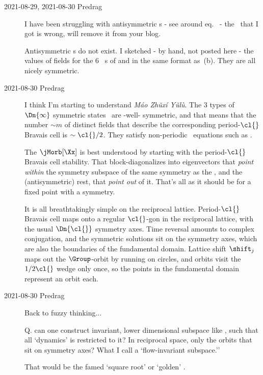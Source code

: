 \begin{description}
\item[2021-08-29, 2021-08-30 Predrag]
I have been struggling with antisymmetric {\lattstate}s - see around
eq.~ -  the \HillDet\ that I got is wrong, will
remove it from your blog.

Antisymmetric {\lattstate}s do not exist. I sketched - by hand,
not posted here -  the values of
{\lattstate} fields for the 6 \henlatt\  {\lattstate}s of
 and  in the same format as
\,(b). They are all nicely symmetric.

\item[2021-08-30 Predrag]
I think I'm starting to understand \emph{Máo Zhǔxí Yǔlù}. The 3 types of
$\Dn{\infty}$ symmetric states \Xx\ are -well- symmetric, and that means
that the number $\sim m$ of distinct fields that describe the
corresponding period-$\cl{}$ Bravais cell is $\sim \cl{}/2$. They satisfy
non-periodic \bcs\ equations such as .

The {\jacobianOrb} $\jMorb[\Xx]$ is best understood by starting with the
period-$\cl{}$ Bravais cell stability. That block-diagonalizes into
eigenvectors that \emph{point within} the symmetry subspace of the same
symmetry as the  {\lattstate}, and the (antisymmetric) rest, that
\emph{point out} of it. That's all as it should be for a fixed point with
a symmetry.

It is all breathtakingly simple on the reciprocal lattice. Period-$\cl{}$
Bravais cell maps onto a regular $\cl{}$-gon in the reciprocal lattice,
with the usual $\Dn{\cl{}}$ symmetry axes. Time reversal amounts to
complex conjugation, and the symmetric solutions sit on the symmetry
axes, which are also the boundaries of the fundamental domain.
Lattice shift $\shift_j$ maps out the $\Group$-orbit by running on
circles, and orbits visit the $1/2\cl{}$ wedge only once, so the points
in the fundamental domain represent an orbit each.

\item[2021-08-30 Predrag] Back to fuzzy thinking...

Q. can one construct invariant, lower dimensional subspace like
, such that all `dynamics' is restricted to it?
In reciprocal space, only the orbits that sit on symmetry axes?
What I call a `flow-invariant subspace.''

That would be the famed `square root' or `golden' \henlatt.


\end{description}
